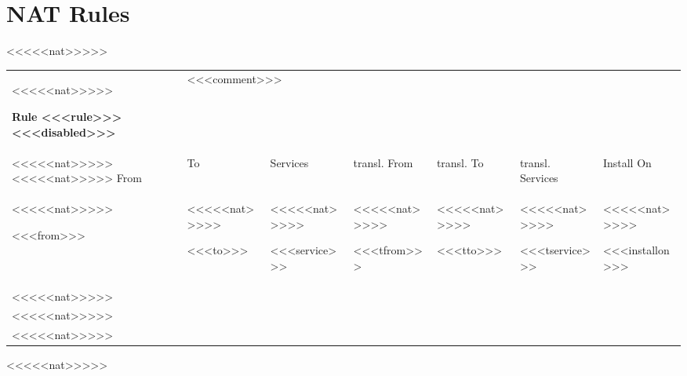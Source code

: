 \documentclass [german,11pt]{article}
\begin{document}
\section{NAT Rules}
<<<<<nat>>>>>\begin{tabular}{lllllll}
<<<<<nat>>>>>    \begin{minipage}[t]{0.14\linewidth}\textbf{Rule <<<rule>>> <<<disabled>>>}\end{minipage} & \multicolumn{6}{l}{\begin{minipage}{0.84\linewidth}<<<comment>>>\end{minipage}}\\
<<<<<nat>>>>>    \hline
<<<<<nat>>>>>    From	& To & Services & transl. From	& transl. To & transl. Services & Install On\\
<<<<<nat>>>>>    \begin{minipage}[t]{0.14\linewidth} <<<from>>> \end{minipage} & %
<<<<<nat>>>>>    \begin{minipage}[t]{0.14\linewidth} <<<to>>> \end{minipage} & %
<<<<<nat>>>>>    \begin{minipage}[t]{0.14\linewidth} <<<service>>> \end{minipage} & %
<<<<<nat>>>>>    \begin{minipage}[t]{0.14\linewidth} <<<tfrom>>> \end{minipage} & %
<<<<<nat>>>>>    \begin{minipage}[t]{0.14\linewidth} <<<tto>>> \end{minipage} & %
<<<<<nat>>>>>    \begin{minipage}[t]{0.14\linewidth} <<<tservice>>> \end{minipage} & %
<<<<<nat>>>>>    \begin{minipage}[t]{0.14\linewidth} <<<installon>>> \end{minipage} \\
<<<<<nat>>>>>    & & \\
<<<<<nat>>>>>    & & \\
<<<<<nat>>>>>\end{tabular}
<<<<<nat>>>>>


\end{document}
